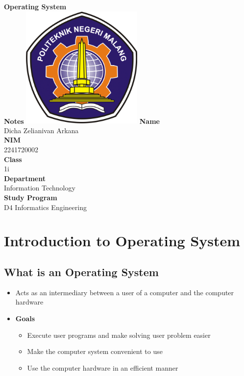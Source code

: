 \documentclass[12pt,titlepage]{article}
\newcommand{\vSubject}{Operating System}
\newcommand{\vSubtitle}{Notes}
\newcommand{\vName}{Dicha Zelianivan Arkana}
\newcommand{\vNIM}{2241720002}
\newcommand{\vClass}{1i}
\newcommand{\vDepartment}{Information Technology}
\newcommand{\vStudyProgram}{D4 Informatics Engineering}
\begin{document}
\begin{titlepage}
    \centering
    \vfill
    {\bfseries\LARGE
        \vSubject\\
        \vskip0.25cm
        \vSubtitle
    }
    \vfill
    \includegraphics[width=6cm]{images/polinema-logo.png}
    \vfill
    {
        \textbf{Name}\\
        \vName\\
        \vskip0.5cm
        \textbf{NIM}\\
        \vNIM\\
        \vskip0.5cm
        \textbf{Class}\\
        \vClass\\
        \vskip0.5cm
        \textbf{Department}\\
        \vDepartment\\
        \vskip0.5cm
        \textbf{Study Program}\\
        \vStudyProgram
    }
\end{titlepage}

\tableofcontents

\newpage

\section{Introduction to Operating System}
\subsection{What is an Operating System}
\begin{itemize}
    \item Acts as an intermediary between a user of a computer and the computer hardware
    \item {
        \textbf{Goals}
        \begin{itemize}
            \item Execute user programs and make solving user problem easier
            \item Make the computer system convenient to use
            \item Use the computer hardware in an efficient manner
        \end{itemize}
    }
\end{itemize}
\end{document}
